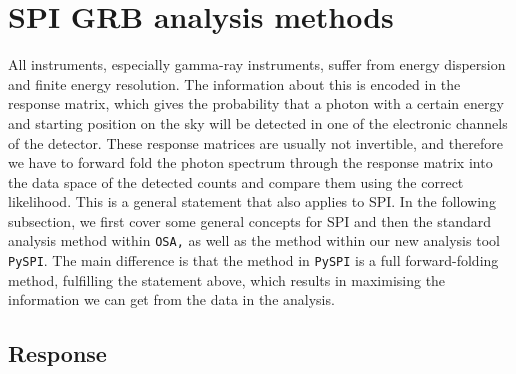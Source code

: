 \documentclass{aa}
\begin{document}
\section{SPI GRB analysis methods}
\label{methods}
All instruments, especially gamma-ray instruments, suffer from energy dispersion and finite energy resolution. The information about this is encoded in the response matrix, which gives the probability that a photon with a certain energy and starting position on the sky will be detected in one of the electronic channels of the detector. These response matrices are usually not invertible, and therefore we have to forward fold the photon spectrum through the response matrix into the data space of the detected counts and compare them using the correct likelihood. This is a general statement that also applies to SPI. In the following subsection, we first cover some general concepts for SPI and then the standard analysis method within {\tt OSA,} as well as the method within our new analysis tool {\tt PySPI}. The main difference is that the method in {\tt PySPI} is a full forward-folding method, fulfilling the statement above, which results in maximising the information we can get from the data in the analysis.

\subsection{Response}
\label{response}
\end{document}
